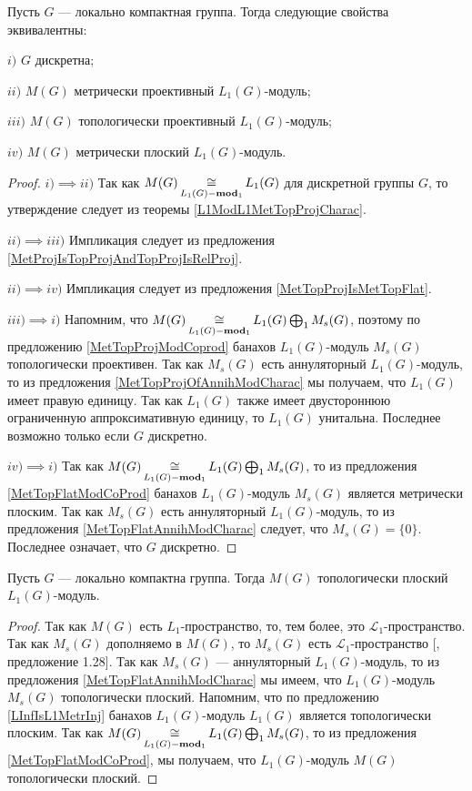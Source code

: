 \begin{proposition}\label{L1MetTopProjAndMetrFlatOfMeasAlg} Пусть $G$ --- локально компактная группа. Тогда следующие свойства эквивалентны:

$i)$ $G$ дискретна;

$ii)$ $M(G)$ метрически проективный $L_1(G)$-модуль;

$iii)$ $M(G)$ топологически проективный $L_1(G)$-модуль;

$iv)$ $M(G)$ метрически плоский $L_1(G)$-модуль.
\end{proposition}
\begin{proof} 
$i)$$\implies$$ ii)$ Так как $M(G)\mathop{\mathbin{\cong}}\limits_{L_1(G)-\mathbf{mod}_1}L_1(G)$ для дискретной группы $G$, то утверждение следует из теоремы \ref{L1ModL1MetTopProjCharac}. 

$ii)$$\implies$$ iii)$ Импликация следует из предложения \ref{MetProjIsTopProjAndTopProjIsRelProj}.

$ii)$$\implies$$ iv)$ Импликация следует из предложения \ref{MetTopProjIsMetTopFlat}.

$iii)$$\implies$$ i)$ Напомним, что $M(G)\mathop{\mathbin{\cong}}\limits_{L_1(G)-\mathbf{mod}_1} L_1(G)\bigoplus_1 M_s(G)$, поэтому по предложению \ref{MetTopProjModCoprod} банахов $L_1(G)$-модуль $M_s(G)$ топологически проективен. Так как $M_s(G)$ есть аннуляторный $L_1(G)$-модуль, то из предложения \ref{MetTopProjOfAnnihModCharac} мы получаем, что $L_1(G)$ имеет правую единицу. Так как $L_1(G)$ также имеет двустороннюю ограниченную аппроксимативную единицу, то $L_1(G)$ унитальна. Последнее возможно только если $G$ дискретно.

$iv)$$\implies$$ i)$ Так как $M(G)\mathop{\mathbin{\cong}}\limits_{L_1(G)-\mathbf{mod}_1} L_1(G)\bigoplus_1 M_s(G)$, то из предложения \ref{MetTopFlatModCoProd} банахов $L_1(G)$-модуль $M_s(G)$ является метрически плоским. Так как $M_s(G)$ есть аннуляторный $L_1(G)$-модуль, то из предложения \ref{MetTopFlatAnnihModCharac} следует, что $M_s(G)=\{0\}$. Последнее означает, что $G$ дискретно.
\end{proof}

\begin{proposition}\label{MeasAlgIsL1TopFlat} Пусть $G$ --- локально компактна группа. Тогда $M(G)$ топологически плоский $L_1(G)$-модуль.
\end{proposition}
\begin{proof} Так как $M(G)$ есть $L_1$-пространство, то, тем более, это  $\mathscr{L}_1$-пространство. Так как $M_s(G)$ дополняемо в $M(G)$, то $M_s(G)$ есть $\mathscr{L}_1$-пространство [\cite{BourgNewClOfLpSp}, предложение 1.28]. Так как $M_s(G)$ --- аннуляторный $L_1(G)$-модуль, то из предложения \ref{MetTopFlatAnnihModCharac} мы имеем, что $L_1(G)$-модуль $M_s(G)$ топологически плоский. Напомним, что по предложению \ref{LInfIsL1MetrInj} банахов $L_1(G)$-модуль $L_1(G)$ является топологически плоским. Так как $M(G)\mathop{\mathbin{\cong}}\limits_{L_1(G)-\mathbf{mod}_1}L_1(G)\bigoplus_1 M_s(G)$, то из предложения \ref{MetTopFlatModCoProd}, мы получаем, что $L_1(G)$-модуль $M(G)$ топологически плоский.
\end{proof}


